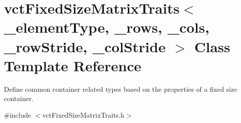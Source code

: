 \hypertarget{classvct_fixed_size_matrix_traits}{}\section{vct\+Fixed\+Size\+Matrix\+Traits$<$ \+\_\+element\+Type, \+\_\+rows, \+\_\+cols, \+\_\+row\+Stride, \+\_\+col\+Stride $>$ Class Template Reference}
\label{classvct_fixed_size_matrix_traits}


Define common container related types based on the properties of a fixed size container.  




{\ttfamily \#include $<$vct\+Fixed\+Size\+Matrix\+Traits.\+h$>$}


